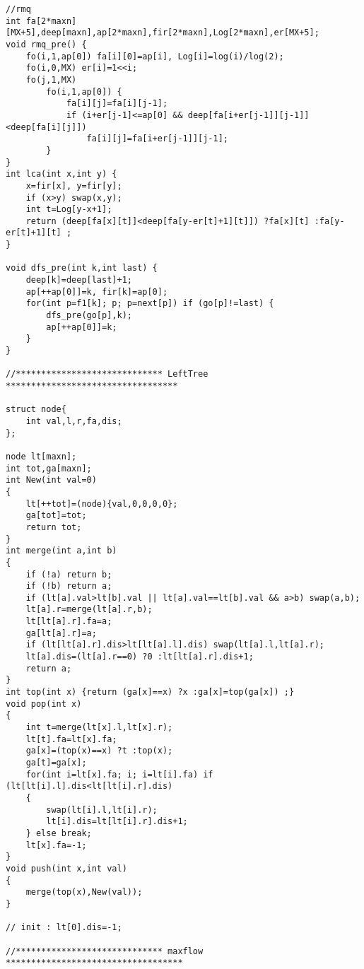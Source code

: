\documentclass{article}
\begin{document}
\begin{multicols}{2}
\begin{lstlisting}
//rmq
int fa[2*maxn][MX+5],deep[maxn],ap[2*maxn],fir[2*maxn],Log[2*maxn],er[MX+5];
void rmq_pre() {
    fo(i,1,ap[0]) fa[i][0]=ap[i], Log[i]=log(i)/log(2);
    fo(i,0,MX) er[i]=1<<i;
    fo(j,1,MX)
        fo(i,1,ap[0]) {
            fa[i][j]=fa[i][j-1];
            if (i+er[j-1]<=ap[0] && deep[fa[i+er[j-1]][j-1]]<deep[fa[i][j]])
                fa[i][j]=fa[i+er[j-1]][j-1];
        }
}
int lca(int x,int y) {
    x=fir[x], y=fir[y];
    if (x>y) swap(x,y);
    int t=Log[y-x+1];
    return (deep[fa[x][t]]<deep[fa[y-er[t]+1][t]]) ?fa[x][t] :fa[y-er[t]+1][t] ;
}

void dfs_pre(int k,int last) {
    deep[k]=deep[last]+1;
    ap[++ap[0]]=k, fir[k]=ap[0];
    for(int p=f1[k]; p; p=next[p]) if (go[p]!=last) {
        dfs_pre(go[p],k);
        ap[++ap[0]]=k;
    }
}

//***************************** LeftTree **********************************

struct node{
    int val,l,r,fa,dis;
};

node lt[maxn];
int tot,ga[maxn];
int New(int val=0)
{
    lt[++tot]=(node){val,0,0,0,0};
    ga[tot]=tot;
    return tot;
}
int merge(int a,int b)
{
    if (!a) return b;
    if (!b) return a;
    if (lt[a].val>lt[b].val || lt[a].val==lt[b].val && a>b) swap(a,b);
    lt[a].r=merge(lt[a].r,b);
    lt[lt[a].r].fa=a;
    ga[lt[a].r]=a;
    if (lt[lt[a].r].dis>lt[lt[a].l].dis) swap(lt[a].l,lt[a].r);
    lt[a].dis=(lt[a].r==0) ?0 :lt[lt[a].r].dis+1;
    return a;
}
int top(int x) {return (ga[x]==x) ?x :ga[x]=top(ga[x]) ;}
void pop(int x)
{
    int t=merge(lt[x].l,lt[x].r);
    lt[t].fa=lt[x].fa;
    ga[x]=(top(x)==x) ?t :top(x);
    ga[t]=ga[x];
    for(int i=lt[x].fa; i; i=lt[i].fa) if (lt[lt[i].l].dis<lt[lt[i].r].dis)
    {
        swap(lt[i].l,lt[i].r);
        lt[i].dis=lt[lt[i].r].dis+1;
    } else break;
    lt[x].fa=-1;
}
void push(int x,int val)
{
    merge(top(x),New(val));
}

// init : lt[0].dis=-1;

//***************************** maxflow ***********************************


\end{lstlisting}
\end{multicols}
\end{document}
